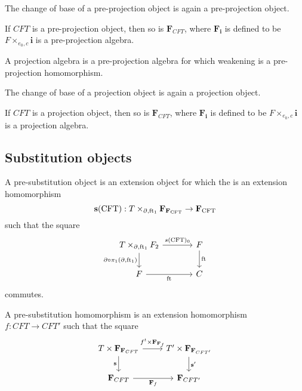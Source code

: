 \begin{lem}
The change of base of a pre-projection object is again a pre-projection object.
\end{lem}

\begin{lem}
If $CFT$ is a pre-projection object, then so is $\mathbf{F}_{CFT}$, where
$\mathbf{F}_{\mathbf{i}}$ is defined to be $F\times_{e_0,c}\mathbf{i}$ is
a pre-projection algebra.
\end{lem}

\begin{defn}
A projection algebra is a pre-projection algebra for which weakening is a
pre-projection homomorphism.
\end{defn}

\begin{cor}
The change of base of a projection object is again a projection object.
\end{cor}

\begin{cor}
If $CFT$ is a projection object, then so is $\mathbf{F}_{CFT}$, where
$\mathbf{F}_{\mathbf{i}}$ is defined to be $F\times_{e_0,c}\mathbf{i}$ is
a projection algebra.
\end{cor}

\subsection{Substitution objects}

\begin{defn}
A pre-substitution object is an extension object for which the is an
extension homomorphism
\begin{equation*}
\mathbf{s}(\stesys):\cobesys{\stesyst}{\famesys{\famesys{\stesys}}}{\ebd}{\eft[1]}\to \famesys{\stesys}
\end{equation*}
such that the square
\begin{equation*}
\begin{tikzcd}[column sep=large]
\pullback{\stesyst}{\stesysf_2}{\ebd}{\eft[1]}
  \ar{r}{s(\stesys)_0}
  \ar{d}[swap]{\ebd\circ\pullbackpr{1}{\ebd}{\eft[1]}}
  &
\stesysf 
  \ar{d}{\eft}
  \\
\stesysf 
  \ar{r}[swap]{\eft}
  &
\stesysc
\end{tikzcd}
\end{equation*}
commutes.
\end{defn}

\begin{defn}
A pre-substitution homomorphism is an extension homomorphism $f:CFT\to CFT'$
such that the square
\begin{equation*}
\begin{tikzcd}
T\times\mathbf{F}_{\mathbf{F}_{CFT}}
  \ar{r}{f^t\times\mathbf{F}_{\mathbf{F}_f}}
  \ar{d}[swap]{\mathbf{s}}
  &
T'\times\mathbf{F}_{\mathbf{F}_{CFT'}}
  \ar{d}{\mathbf{s}'}
  \\
\mathbf{F}_{CFT}
  \ar{r}[swap]{\mathbf{F}_f}
  &
\mathbf{F}_{CFT'}
\end{tikzcd}
\end{equation*}
\end{defn}

